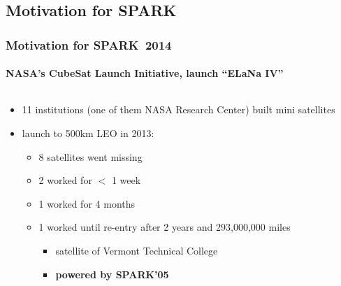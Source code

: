 \subsection*{Motivation for SPARK}
\begin{frame}
  \frametitle{Motivation for SPARK~2014}
  \framesubtitle{NASA's CubeSat Launch Initiative, launch ``ELaNa IV''}
  \begin{columns}
    \begin{column}[T]{.6\textwidth}
      \begin{itemize}
      \item 11 institutions (one of them NASA Research Center) built mini satellites
      \item launch to 500km LEO in 2013:
        \begin{itemize}
          \item 8 satellites went missing
          \item 2 worked for $<$ 1 week
          \item 1 worked for 4 months
          \item 1 worked until re-entry after 2 years and 293,000,000 miles
            \begin{itemize}
            \item satellite of Vermont Technical College
            \item \textbf{powered by SPARK'05}
            \end{itemize}
        \end{itemize}
      \end{itemize}
    \end{column}
    \begin{column}[T]{.5\textwidth}
    \end{column}
  \end{columns}
\end{frame}
\addtocounter{clock}{2}

